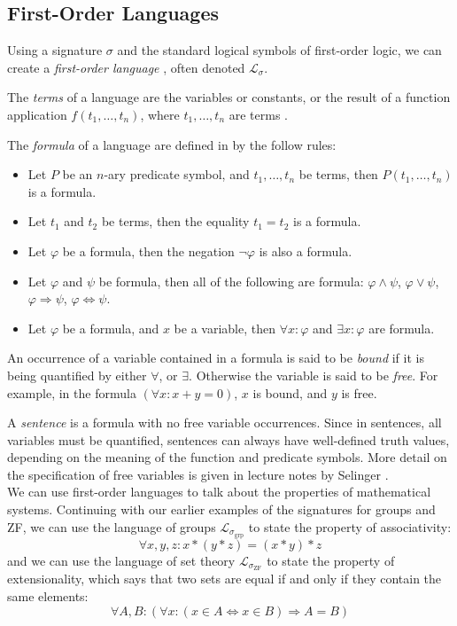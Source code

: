\documentclass[11pt]{report}
\theoremstyle{definition}
\theoremstyle{theorem}
\theoremstyle{lemma}
\begin{document}
\subsection{First-Order Languages}
Using a signature $\sigma$ and the standard logical symbols of first-order logic, we can create a \emph{first-order language} \cite[ch.~1]{stanmodel}, often denoted $\mathcal{L}_\sigma$.

The \emph{terms} of a language are the variables or constants, or the result of a function application $f(t_1,\ldots, t_n)$, where $t_1,\ldots,t_n$ are terms \cite[ch.~1.3]{selinger}.

The \emph{formula} of a language are defined in \cite[ch~1.4]{selinger}by the follow rules:
\begin{itemize}
  \item Let $P$ be an $n$-ary predicate symbol, and $t_1,\ldots,t_n$ be terms, then $P(t_1,\ldots,t_n)$ is a formula.
  \item Let $t_1$ and $t_2$ be terms, then the equality $t_1 = t_2$ is a formula.
  \item Let $\varphi$ be a formula, then the negation $\neg\varphi$ is also a formula.
  \item Let $\varphi$ and $\psi$ be formula, then all of the following are formula: $\varphi\wedge\psi$, $\varphi\vee\psi$, $\varphi\Rightarrow\psi$, $\varphi\Leftrightarrow\psi$.
  \item Let $\varphi$ be a formula, and $x$ be a variable, then $\forall x:\varphi$ and $\exists x:\varphi$ are formula.
\end{itemize}
An occurrence of a variable contained in a formula is said to be \emph{bound} if it is being quantified by either $\forall$, or $\exists$.
Otherwise the variable is said to be \emph{free}. For example, in the formula $(\forall x: x+y=0)$, $x$ is bound, and $y$ is free.

A \emph{sentence} is a formula with no free variable occurrences.
Since in sentences, all variables must be quantified, sentences can always have well-defined truth values, depending on the meaning of the function and predicate symbols.
More detail on the specification of free variables is given in lecture notes by Selinger \cite[ch.~1.9]{selinger}.\\

\noindent
We can use first-order languages to talk about the properties of mathematical systems.
Continuing with our earlier examples of the signatures for groups and ZF, we can use the language of groups $\mathcal{L}_{\sigma_{\text{grp}}}$ to state the property of associativity:
$$\forall x,y,z: x*(y*z) = (x*y)*z$$
and we can use the language of set theory $\mathcal{L}_{\sigma_{\text{ZF}}}$ to state the property of extensionality, which says that two sets are equal if and only if they contain the same elements:
$$\forall A,B: (\forall x:(x\in A \Leftrightarrow x\in B) \Rightarrow A = B)$$
\end{document}

